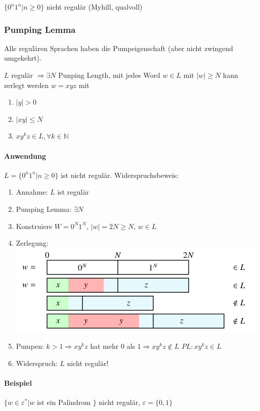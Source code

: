 $\{0^n 1^n | n \geq 0\}$ nicht regulär (Myhill, qualvoll)

\subsubsection{Pumping Lemma}

Alle regulären Sprachen haben die Pumpeigenschaft (aber nicht zwingend umgekehrt).

$L$ regulär $\Rightarrow \exists N$ Punping Length, mit jedes Word $w \in L$ mit $|w| \geq N$ kann zerlegt werden $w=xyz$ mit 
\begin{enumerate}
	\item $|y| > 0$
	\item $|xy| \leq N$
	\item $xy^kz \in L, \forall k \in \mathbb{N}$
\end{enumerate}

\paragraph{Anwendung}

$L=\{0^n1^n|n \geq 0 \}$ ist nicht regulär. Widerspruchsbeweis:

\begin{enumerate}
	\item	Annahme: $L$ ist regulär
	\item	Pumping Lemma: $\exists N$
	\item	Konstruiere $W = 0^N1^N$, $|w| = 2N \geq N$, $w \in L$
	\item	Zerlegung: \\
			\includegraphics[scale=0.5]{img/pumpinglemma.png}
	\item	Pumpen: $k > 1 \Rightarrow xy^kz$ hat mehr $0$ als $1 \Rightarrow xy^kz \not\in L$ \Lightning $PL: xy^kz \in L$
	\item	Widerspruch: $L$ nicht regulär!
\end{enumerate}

\paragraph{Beispiel}
$\{w \in \varepsilon^\ast | w \text{ ist ein Palindrom }\}$ nicht regulär, $\varepsilon = \{0,1\}$

